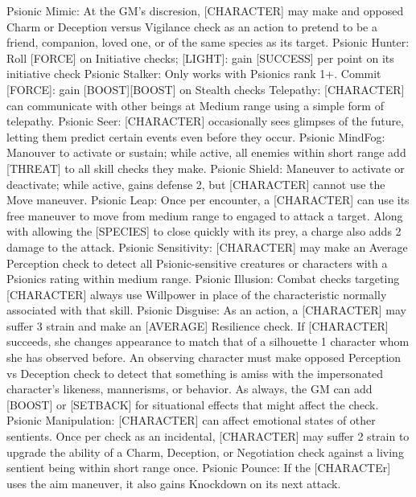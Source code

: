 Psionic Mimic: At the GM's discresion, [CHARACTER] may make and opposed Charm or Deception versus Vigilance check as an action to pretend to be a friend, companion, loved one, or of the same species as its target.
Psionic Hunter: Roll [FORCE] on Initiative checks; [LIGHT]: gain [SUCCESS] per point on its initiative check
Psionic Stalker: Only works with Psionics rank 1+. Commit [FORCE]: gain [BOOST][BOOST] on Stealth checks
Telepathy: [CHARACTER] can communicate with other beings at Medium range using a simple form of telepathy.
Psionic Seer: [CHARACTER] occasionally sees glimpses of the future, letting them predict certain events even before they occur.
Psionic MindFog: Manouver to activate or sustain; while active, all enemies within short range add [THREAT] to all skill checks they make.
Psionic Shield: Maneuver to activate or deactivate; while active, gains defense 2, but [CHARACTER] cannot use the Move maneuver.
Psionic Leap: Once per encounter, a [CHARACTER] can use its free maneuver to move from medium range to engaged to attack a target. Along with allowing the [SPECIES] to close quickly with its prey, a charge also adds 2 damage to the attack.
Psionic Sensitivity: [CHARACTER] may make an Average Perception check to detect all Psionic-sensitive creatures or characters with a Psionics rating within medium range.
Psionic Illusion: Combat checks targeting [CHARACTER] always use Willpower in place of the characteristic normally associated with that skill.
Psionic Disguise: As an action, a [CHARACTER] may suffer 3 strain and make an [AVERAGE] Resilience check. If [CHARACTER] succeeds, she changes appearance to match that of a silhouette 1 character whom she has observed before. An observing character must make opposed Perception vs Deception check to detect that something is amiss with the impersonated character's likeness, mannerisms, or behavior. As always, the GM can add [BOOST] or [SETBACK] for situational effects that might affect the check.
Psionic Manipulation: [CHARACTER] can affect emotional states of other sentients. Once per check as an incidental, [CHARACTER] may suffer 2 strain to upgrade the ability of a Charm, Deception, or Negotiation check against a living sentient being within short range once.
Psionic Pounce: If the [CHARACTEr] uses the aim maneuver, it also gains Knockdown on its next attack.
